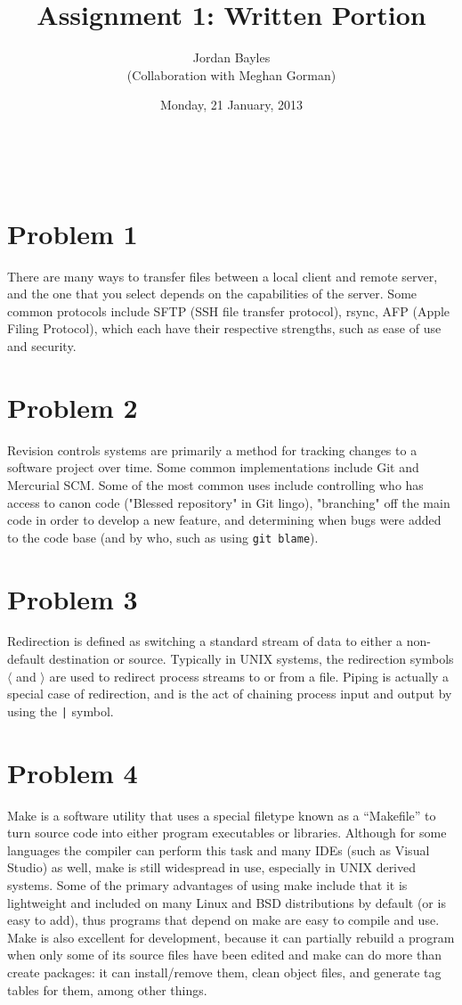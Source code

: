 \documentclass[12pt,letterpaper]{article}
\author{Jordan Bayles\\(Collaboration with Meghan Gorman)}
\title{Assignment 1: Written Portion}
\date{Monday, 21 January, 2013}
\makeatletter
\let\thetitle\@title
\let\theauthor\@author
\let\thedate\@date
\makeatother
\begin{document}
\begin{flushright}
\theauthor\\
\thedate
\end{flushright}
\begin{center}
\thetitle
\end{center}
% 
%

\section*{Problem 1}
There are many ways to transfer files between a local client and remote server,
and the one that you select depends on the capabilities of the server. Some
common protocols include
SFTP (SSH file transfer protocol), rsync, AFP (Apple Filing Protocol), which
each have their respective strengths, such as ease of use and security.

\section*{Problem 2}
Revision controls systems are primarily a method for tracking changes to
a software project over time. Some common implementations include Git and
Mercurial SCM. Some of the most common uses include controlling who has
access to canon code ("Blessed repository" in Git lingo), "branching" off
the main code in order to develop a new feature, and determining when bugs
were added to the code base (and by who, such as using \verb!git blame!).

\section*{Problem 3}
Redirection is defined as switching a standard stream of data to either a
non-default destination or source. Typically in UNIX systems, the redirection
symbols $\langle$ and $\rangle$ are used to redirect process streams to
or from a file. Piping is actually a special case of redirection, and is the
act of chaining process input and output by using the \verb!|! symbol.

\section*{Problem 4}
Make is a software utility that uses a special filetype known as a ``Makefile''
to turn source code into either program executables or libraries. Although for
some languages the compiler can perform this task and many IDEs (such as
Visual Studio) as well, make is still widespread in use, especially in UNIX
derived systems. Some of the primary advantages of using make include that it
is lightweight and included on many Linux and BSD distributions by default (or
is easy to add), thus programs that depend on make are easy to compile and use.
Make is also excellent for development, because it can partially rebuild a program
when only some of its source files have been edited and make can do more than create
packages: it can install/remove them, clean object files, and generate tag
tables for them, among other things.
\end{document}
